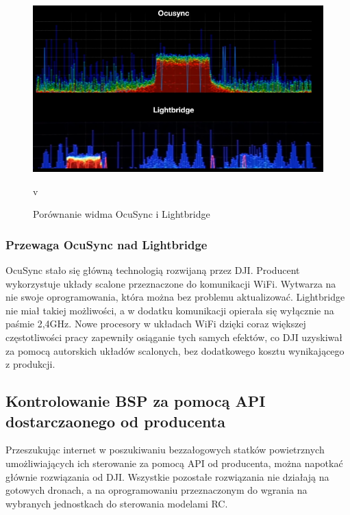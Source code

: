 \begin{figure}[!htbp]
\begin{center}
  \includegraphics[width=14cm]{./Obrazy/ocusync_vs_lightbridge.png}
\caption{Porównanie widma OcuSync i Lightbridge}
\end{center}
v
\end{figure}

\newpage

\subsubsection{Przewaga OcuSync nad Lightbridge}
OcuSync stało się główną technologią rozwijaną przez DJI. Producent wykorzystuje układy scalone przeznaczone do komunikacji WiFi. Wytwarza na nie swoje oprogramowania, która można bez problemu aktualizować. Lightbridge nie miał takiej możliwości, a w dodatku komunikacji opierała się wyłącznie na paśmie 2,4GHz. Nowe procesory w układach WiFi dzięki coraz większej częstotliwości pracy zapewniły osiąganie tych samych efektów, co DJI uzyskiwał za pomocą autorskich układów scalonych, bez dodatkowego kosztu wynikającego z produkcji.

\subsection{Kontrolowanie BSP za pomocą API dostarczaonego od producenta}
Przeszukując internet w poszukiwaniu bezzałogowych statków powietrznych umożliwiających ich sterowanie za pomocą API od producenta, można napotkać głównie rozwiązania od DJI. Wszystkie pozostałe rozwiązania nie działają na gotowych dronach, a na oprogramowaniu przeznaczonym do wgrania na wybranych jednostkach do sterowania modelami RC.

